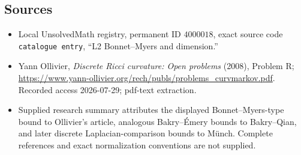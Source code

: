 \documentclass[11pt]{article}
\begin{document}
\subsection{Sources}
\begin{itemize}
\item Local UnsolvedMath registry, permanent ID \(4000018\), exact source code \texttt{catalogue entry}, ``L2 Bonnet--Myers and dimension.''
\item Yann Ollivier, \emph{Discrete Ricci curvature: Open problems} (2008), Problem R; \url{https://www.yann-ollivier.org/rech/publs/problems_curvmarkov.pdf}. Recorded access 2026-07-29; pdf-text extraction.
\item Supplied research summary attributes the displayed Bonnet--Myers-type bound to Ollivier's article, analogous Bakry--Émery bounds to Bakry--Qian, and later discrete Laplacian-comparison bounds to Münch. Complete references and exact normalization conventions are not supplied.
\end{itemize}
\end{document}
